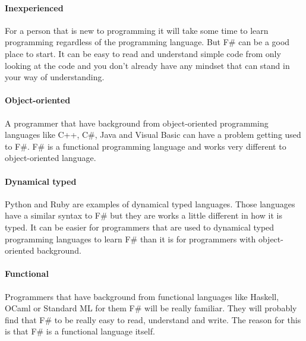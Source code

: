 \documentclass[12pt, a4paper]{article}
\newcommand*\quotefont{\fontfamily{LinuxLibertineT-LF}} %
\newcommand*\quotesize{60} %
\newcommand*{\openquote}
   {\tikz[remember picture,overlay,xshift=-4ex,yshift=-2.5ex]
   \node (OQ) {\quotefont\fontsize{\quotesize}{\quotesize}\selectfont``};\kern0pt}
\newcommand*{\closequote}[1]
  {\tikz[remember picture,overlay,xshift=4ex,yshift={#1}]
   \node (CQ) {\quotefont\fontsize{\quotesize}{\quotesize}\selectfont''};}
\newcommand*\shadedauthorformat{\emph} %
\newcommand*\authoralign[1]{
 	\def\authorfill{\hfill}\def\quotefill{}
}
\newenvironment{shadequote}[2][l]%
{\authoralign{#1}
\ifblank{#2}
   {\def\shadequoteauthor{}\def\yshift{-2ex}\def\quotefill{\hfill}}
   {\def\shadequoteauthor{\par\authorfill\shadedauthorformat{#2}}\def\yshift{2ex}}
\begin{snugshade}\begin{quote}\openquote}
{\shadequoteauthor\quotefill\closequote{\yshift}\end{quote}\end{snugshade}}
\begin{document}
\paragraph{Inexperienced}
For a person that is new to programming it will take some time to learn programming regardless of the programming language. But F\# can be a good place to start. It can be easy to read and understand simple code from only looking at the code and you don't already have any mindset that can stand in your way of understanding.

\paragraph{Object-oriented}
A programmer that have background from object-oriented programming languages like C++, C\#, Java and Visual Basic can have a problem getting used to F\#. F\# is a functional programming language and works very different to object-oriented language.


\paragraph{Dynamical typed}
Python and Ruby are examples of dynamical typed languages. Those languages have a similar syntax to F\# but they are works a little different in how it is typed. It can be easier for programmers that are used to dynamical typed programming languages to learn F\# than it is for programmers with object-oriented background.  


\paragraph{Functional}
Programmers that have background from functional languages like Haskell, OCaml or Standard ML for them F\# will be really familiar. They will probably find that F\# to be really easy to read, understand and write. The reason for this is that F\# is a functional language itself. 


\newpage


\newpage
\end{document}
